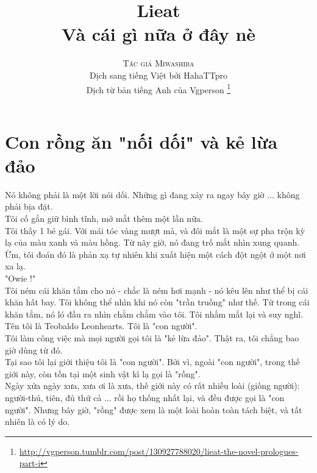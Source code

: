 \documentclass[13pt]{extarticle}
\title{\Huge \textbf{Lieat} \\ Và cái gì nữa ở đây nè }
\author{\textsc{Tác giả Miwashiba} \\ Dịch sang tiếng Việt bởi HahaTTpro \\ Dịch từ bản tiếng Anh của Vgperson \thanks{\url{http://vgperson.tumblr.com/post/130927788020/lieat-the-novel-prologues-part-i}}}
\begin{document}
	
	\maketitle
	
	\pagebreak
		
	\tableofcontents
	
	\pagebreak
	
	\section{Con rồng ăn "nối dối" và kẻ lừa đảo}
	Nó không phải là một lời nói dối. Những gì đang xảy ra ngay bây giờ ... không phải bịa đặt.\\
	
	Tôi cố gắn giữ bình tĩnh, mở mắt thêm một lần nữa.\\
	
	Tôi thấy 1 bé gái. Với mái tóc vàng mượt mà, và đôi mắt là một sự pha trộn kỳ lạ của màu xanh và màu hồng. Từ nãy giờ, nó đang trố mắt nhìn xung quanh. Ừm, tôi đoán đó là phản xạ tự nhiên khi xuất hiện một cách đột ngột ở một nơi xa lạ.\\
	
	"Owie !"\\
	
	Tôi ném cái khăn tắm cho nó - chắc là ném hơi mạnh - nó kêu lên như thể bị cái khăn hất bay. Tôi không thể nhìn khi nó còn "trần truồng" như thế. Từ trong cái khăn tắm, nó ló đầu ra nhìn chằm chằm vào tôi. Tôi nhắm mắt lại và suy nghĩ. \\
	
	Tên tôi là Teobaldo Leonhearts. Tôi là "con người". \\
	
	Tôi làm công việc mà mọi người gọi tôi là "kẻ lừa đảo". Thật ra, tôi chẳng bao giờ dùng từ đó. \\
	
	Tại sao tôi lại giới thiệu tôi là "con người". Bởi vì, ngoài "con người", trong thế giới này, còn tồn tại một sinh vật kì lạ gọi là "rồng". \\
	
	Ngày xửa ngày xưa, xưa ơi là xưa, thế giới này có rất nhiều loài (giống người): người-thú, tiên, đủ thứ cả ... rồi họ thống nhất lại, và đều được gọi là "con người". Nhưng bây giờ, "rồng" được xem là một loài hoàn toàn tách biệt, và tất nhiên là có lý do. \\
	
\end{document}
